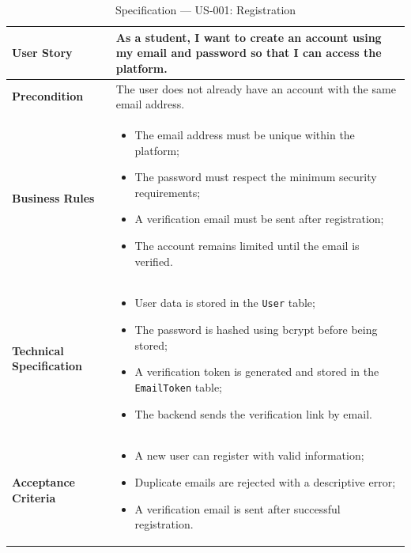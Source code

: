 \begin{table}[H]
\centering
\caption{Specification — US-001: Registration}
\label{tab:us001}
\renewcommand{\arraystretch}{1}
\begin{tabularx}{\textwidth}{|p{2.5cm}|X|}
\hline
\textbf{User Story} & As a student, I want to create an account using my email and password so that I can access the platform. \\
\hline
\textbf{Precondition} & The user does not already have an account with the same email address. \\
\hline
\textbf{Business Rules} &
\begin{itemize}
  \item The email address must be unique within the platform;
  \item The password must respect the minimum security requirements;
  \item A verification email must be sent after registration;
  \item The account remains limited until the email is verified.
\end{itemize} \\
\hline
\textbf{Technical Specification} &
\begin{itemize}
  \item User data is stored in the \texttt{User} table;
  \item The password is hashed using bcrypt before being stored;
  \item A verification token is generated and stored in the \texttt{EmailToken} table;
  \item The backend sends the verification link by email.
\end{itemize} \\
\hline
\textbf{Acceptance Criteria} &
\begin{itemize}
  \item A new user can register with valid information;
  \item Duplicate emails are rejected with a descriptive error;
  \item A verification email is sent after successful registration.
\end{itemize} \\
\hline
\end{tabularx}
\end{table}

